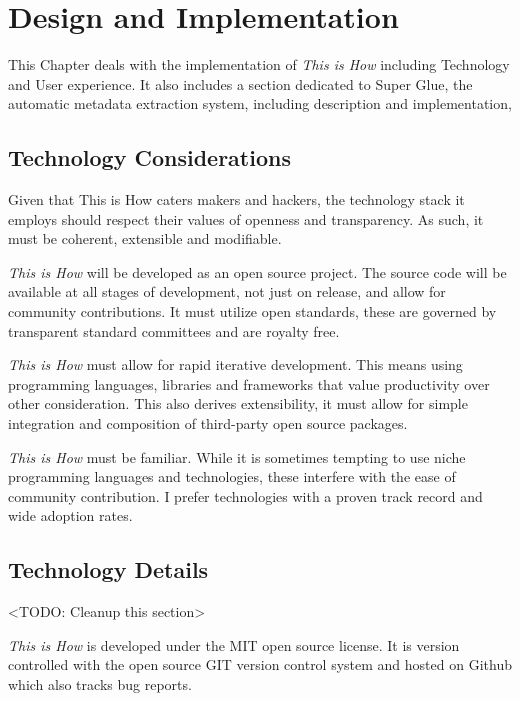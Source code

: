 \chapter{Design and Implementation}
\label{chap_design}


This Chapter deals with the implementation of \textit{This is How} including Technology and User experience. It also includes a section dedicated to Super Glue, the automatic metadata extraction system, including description and implementation, 

\section{Technology Considerations}

Given that This is How caters makers and hackers, the technology stack it employs should respect their values of openness and transparency. As such, it must be coherent, extensible and modifiable.
 
\textit{This is How} will be developed as an open source project. The source code will be available at all stages of development, not just on release, and allow for community contributions. It must utilize open standards, these are governed by transparent standard committees and are royalty free. 

\textit{This is How} must allow for rapid iterative development. This means using programming languages, libraries and frameworks that value productivity over other consideration. This also derives extensibility, it must allow for simple integration and composition of third-party open source packages. 

\textit{This is How} must be familiar. While it is sometimes tempting to use niche programming languages and technologies, these interfere with the ease of community contribution. I prefer technologies with a proven track record and wide adoption rates.

\section{Technology Details}

<TODO: Cleanup this section>

\textit{This is How} is developed under the MIT open source license. It is version controlled with the open source GIT\cite{git} version control system and hosted on Github\cite{github} which also tracks bug reports. 

